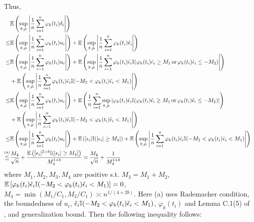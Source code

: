 \iffalse
Thus,
\begin{align}
&\mathbb{E}\left(\sup_{\hat{\pi},\hat\mu}\left|\frac{1}{n}\sum_{i=1}^n\varphi_k(t_i)\delta_i\right|\right)
\nonumber
\\\leq&
\mathbb{E}\left(\sup_{\hat{\pi},\hat\mu}\left|\frac{1}{n}\sum_{i=1}^n\varphi_k(t_i)u_i\right|\right)
+
\mathbb{E}\left(\sup_{\hat{\pi},\hat\mu}\left|\frac{1}{n}\sum_{i=1}^n\varphi_k(t_i)\tilde\epsilon_i\right|\right)
\nonumber
\\\leq &
\mathbb{E}\left(\sup_{\hat{\pi},\hat\mu}\left|\frac{1}{n}\sum_{i=1}^n\varphi_k(t_i)u_i\right|\right)
+
\mathbb{E}\left(\sup_{\hat{\pi},\hat\mu}\left|\frac{1}{n}\sum_{i=1}^n\varphi_k(t_i)\tilde\epsilon_i\mathbb{I}(\varphi_k(t_i)\tilde\epsilon_i\geq M_1\,\text{or}\,\varphi_k(t_i)\tilde\epsilon_i\leq -M_2)\right|\right)
\nonumber
\\&+
\mathbb{E}\left(\sup_{\hat{\pi},\hat\mu}\left|\frac{1}{n}\sum_{i=1}^n\varphi_k(t_i)\tilde\epsilon_i\mathbb{I}(-M_2<\varphi_k(t_i)\tilde\epsilon_i< M_1)\right|\right)
\nonumber
\\\leq&
\mathbb{E}\left(\sup_{\hat{\pi},\hat\mu}\left|\frac{1}{n}\sum_{i=1}^n\varphi_k(t_i)u_i\right|\right)
+
\mathbb{E}\left(\frac{1}{n}\sum_{i=1}^n\sup_{\hat{\pi},\hat\mu}\left|\varphi_k(t_i)\tilde\epsilon_i\mathbb{I}(\varphi_k(t_i)\tilde\epsilon_i\geq M_1\,\text{or}\,\varphi_k(t_i)\tilde\epsilon_i\leq -M_2)\right|\right)
\nonumber
\\&+
\mathbb{E}\left(\sup_{\hat{\pi},\hat\mu}\left|\frac{1}{n}\sum_{i=1}^n\varphi_k(t_i)\tilde\epsilon_i\mathbb{I}(-M_2<\varphi_k(t_i)\tilde\epsilon_i< M_1)\right|\right)
\nonumber
\\\leq&
\mathbb{E}\left(\sup_{\hat{\pi},\hat\mu}\left|\frac{1}{n}\sum_{i=1}^n\varphi_k(t_i)u_i\right|\right)
+
\mathbb{E}\left(\left|\epsilon_i|\mathbb{I}(|\epsilon_i|\geq M_4\right|\right)
+
\mathbb{E}\left(\sup_{\hat{\pi},\hat\mu}\left|\frac{1}{n}\sum_{i=1}^n\varphi_k(t_i)\tilde\epsilon_i\mathbb{I}(-M_2<\varphi_k(t_i)\tilde\epsilon_i< M_1)\right|\right)
\nonumber
\\\overset{(a)}{\lesssim}&
\frac{M_4}{\sqrt{n}}
+
\frac{\mathbb{E}\left(\left|\epsilon_i|^{2+b}\mathbb{I}(|\epsilon_i|\geq M_4\right|\right)}{M_4^{1+b}}
\asymp
\frac{M_4}{\sqrt{n}}+\frac{1}{M_4^{1+b}}
\end{align}
where $M_1,M_2,M_3,M_4$ are positive s.t. $M_3=M_1+M_2$, $\mathbb{E}\left[\varphi_k(t_i)\tilde\epsilon_i\mathbb{I}(-M_2<\varphi_k(t_i)\tilde\epsilon_i< M_1)\right]=0$, $M_4=\min(M_1/C_1,M_2/C_1)\asymp n^{1/(4+2b)}$. Here (a) uses {\color{red}Rademacher condition}, the boundedness of $u_i$, $\tilde\epsilon_i\mathbb{I}(-M_2<\varphi_k(t_i)\tilde\epsilon_i< M_1)$, $\varphi_k(t_i)$ and Lemma C.1(5) of \cite{liu2018stein}, and generalization bound.
Then the following inequality follows:



